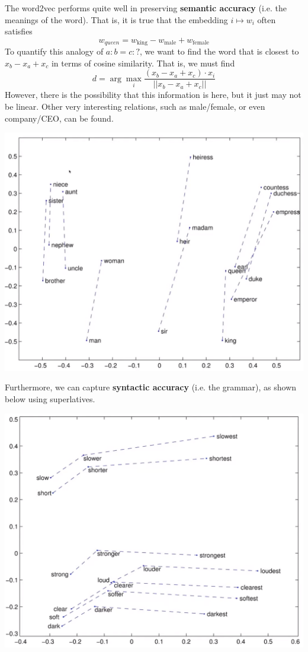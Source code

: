 \documentclass{article}
\begin{document}
      The word2vec performs quite well in preserving \textbf{semantic accuracy} (i.e. the meanings of the word). That is, it is true that the embedding $i \mapsto w_i$ often satisfies 
      \[w_{queen} = w_{\mathrm{king}} - w_{\mathrm{male}} + w_{\mathrm{female}}\]
      To quantify this analogy of $a : b = c : ?$, we want to find the word that is closest to $x_b - x_a + x_c$ in terms of cosine similarity. That is, we must find 
      \[d = \arg \max_i \frac{(x_b - x_a + x_c) \cdot x_i}{|| x_b - x_a + x_c ||}\]
      However, there is the possibility that this information is here, but it just may not be linear. Other very interesting relations, such as male/female, or even company/CEO, can be found. 
      \begin{center}
          \includegraphics[scale=0.3]{img/GloVe_Visual.png}
      \end{center}
      Furthermore, we can capture \textbf{syntactic accuracy} (i.e. the grammar), as shown below using superlatives. 
      \begin{center}
          \includegraphics[scale=0.3]{img/syntactic.png}
      \end{center}
\end{document}
